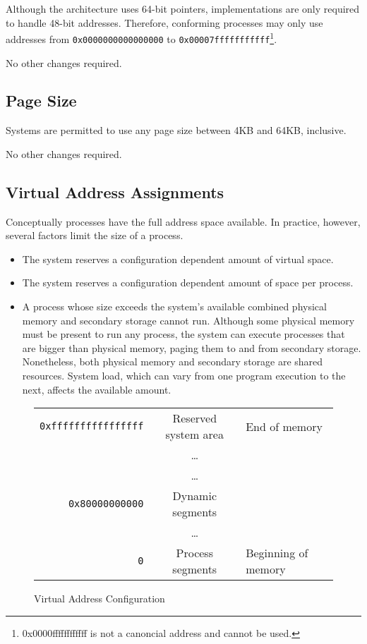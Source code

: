 Although the \xARCH architecture uses 64-bit pointers, implementations
are only required to handle 48-bit addresses.  Therefore, conforming
processes may only use addresses from \texttt{0x0000000000000000} to
\texttt{0x00007fffffffffff}\footnote{0x0000ffffffffffff is not a
  canoncial address and cannot be used.}.

No other changes required.

\subsection{Page Size}

Systems are permitted to use any page size between 4KB and 64KB,
inclusive.

No other changes required.

\subsection{Virtual Address Assignments}

Conceptually processes have the full address space available.
In practice, however, several factors limit the size of a process.
\begin{itemize}
  \item The system reserves a configuration dependent amount of virtual space.
  \item The system reserves a configuration dependent amount of space per
    process.
  \item
    A process whose size exceeds the system's available combined physical
    memory and secondary storage cannot run. Although some physical memory
    must be present to run any process, the system can execute processes that
    are bigger than physical memory, paging them to and from secondary storage.
    Nonetheless, both physical memory and secondary storage are
    shared resources. System load, which can vary from one program execution
    to the next, affects the available amount.
\end{itemize}

\begin{figure}[H]
\Hrule
  \caption{Virtual Address Configuration}
  \label{fig-address}
  \begin{center}
    \begin{tabular}{r|c|l}
      \noalign{\smallskip}  \cline{2-2}
      \verb|0xffffffffffffffff| & Reserved system area & End of memory\\ 
      & \dots & \\ \cline{2-2}
      & \dots & \\
      \verb|0x80000000000| & Dynamic segments & \\ \cline{2-2}
      & \dots & \\
      \verb|0| & Process segments & Beginning of memory\\ \cline{2-2}
    \end{tabular}
  \end{center}
\Hrule
\end{figure}

